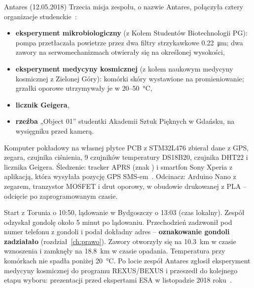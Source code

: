 \clearpage
\begin{sekcja}{Antares (12.05.2018)}
Trzecia misja zespołu, o nazwie Antares, połączyła cztery organizacje studenckie~\cite{gbsc2018}:
\begin{itemize}
  \item \textbf{eksperyment mikrobiologiczny} (z Kołem Studentów Biotechnologii PG): pompa przetłaczała powietrze przez dwa filtry strzykawkowe \SI{0.22}{\micro m}; dwa zawory na serwomechanizmach otwierały się na określonej wysokości,
  \item \textbf{eksperyment medycyny kosmicznej} (z kołem naukowym medycyny kosmicznej z Zielonej Góry): komórki skóry wystawione na promieniowanie; grzałki oporowe utrzymywały je w 20--\SI{50}{\degreeCelsius},
  \item \textbf{licznik Geigera},
  \item \textbf{rzeźba} „Object 01” studentki Akademii Sztuk Pięknych w Gdańsku, na wysięgniku przed kamerą.
\end{itemize}
Komputer pokładowy na własnej płytce PCB z STM32L476 zbierał dane z GPS, zegara, czujnika ciśnienia, 9 czujników temperatury DS18B20, czujnika DHT22 i licznika Geigera. Śledzenie: tracker APRS (znak ) i smartfon Sony Xperia z aplikacją, która wysyłała pozycję GPS SMS-em~\cite{gbsc2018}. Odcinacz: Arduino Nano z zegarem, tranzystor MOSFET i drut oporowy, w obudowie drukowanej z PLA -- odcięcie po zaprogramowanym czasie.

Start z Torunia o 10:50, lądowanie w Bydgoszczy o 13:03 (czas lokalny). Zespół odzyskał gondolę około 5 minut po lądowaniu. Przechodzień zadzwonił pod numer telefonu z gondoli i podał dokładny adres -- \textbf{oznakowanie gondoli zadziałało} (rozdział~\ref{ch:prawo}). Zawory otworzyły się na \SI{10.3}{km} w czasie wznoszenia i zamknęły na \SI{18.8}{km} w czasie opadania. Temperatura przy komórkach nie spadła poniżej \SI{20}{\degreeCelsius}. Po locie zespół Antares zgłosił eksperyment medycyny kosmicznej do programu REXUS/BEXUS i przeszedł do kolejnego etapu wyboru: prezentacji przed ekspertami ESA w listopadzie 2018 roku~\cite{fbsimle}.

\end{sekcja}

